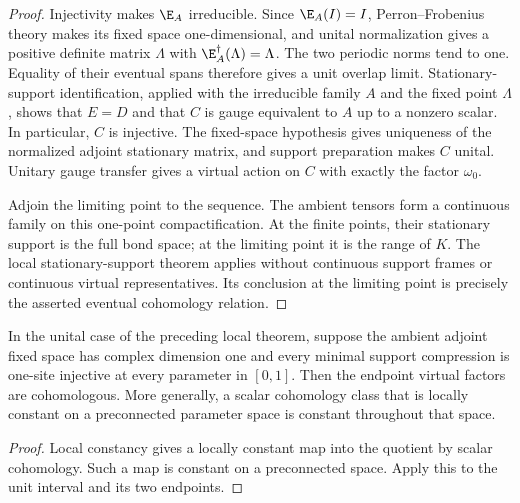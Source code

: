 \begin{proof}\leanok
    Injectivity makes $\E_A$ irreducible. Since $\E_A(I)=I$,
    Perron--Frobenius theory makes its fixed space one-dimensional,
    and unital normalization gives a positive definite matrix
    $\Lambda$ with $\E_A^\dagger(\Lambda)=\Lambda$.
    The two periodic norms tend to one. Equality of their eventual spans
    therefore gives a unit overlap limit. Stationary-support identification,
    applied with the irreducible family $A$ and the fixed point $\Lambda$,
    shows that $E=D$ and that $C$ is gauge equivalent to $A$ up to a nonzero
    scalar. In particular, $C$ is injective. The fixed-space hypothesis gives
    uniqueness of the normalized adjoint stationary matrix, and support
    preparation makes $C$ unital. Unitary gauge transfer gives a virtual
    action on $C$ with exactly the factor $\omega_0$.

    Adjoin the limiting point to the sequence. The ambient tensors form a
    continuous family on this one-point compactification. At the finite points,
    their stationary support is the full bond space; at the limiting point
    it is the range of $K$. The local stationary-support theorem applies
    without continuous support frames or continuous virtual representatives.
    Its conclusion at the limiting point is precisely the asserted eventual
    cohomology relation.
\end{proof}

\begin{lemma}
    \label{thm:spt_unital_supported_path_class}
    \leanok
    In the unital case of the preceding local theorem, suppose the ambient
    adjoint fixed space has complex dimension one and every minimal support
    compression is one-site injective at every parameter in $[0,1]$.
    Then the endpoint virtual factors are cohomologous. More generally,
    a scalar cohomology class that is locally constant on a preconnected
    parameter space is constant throughout that space.
\end{lemma}

\begin{proof}\leanok
    Local constancy gives a locally constant map into the quotient by
    scalar cohomology. Such a map is constant on a preconnected space.
    Apply this to the unit interval and its two endpoints.
\end{proof}
